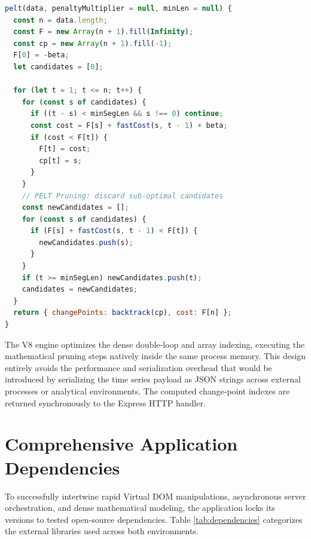 \vspace{1em}
\noindent\begin{minipage}{\linewidth}
\begin{lstlisting}[language=JavaScript, caption=Native V8 Execution Loop for PELT Math Validation, label=lst:js_ipc]
pelt(data, penaltyMultiplier = null, minLen = null) {
  const n = data.length;
  const F = new Array(n + 1).fill(Infinity);
  const cp = new Array(n + 1).fill(-1);
  F[0] = -beta;
  let candidates = [0];

  for (let t = 1; t <= n; t++) {
    for (const s of candidates) {
      if ((t - s) < minSegLen && s !== 0) continue;
      const cost = F[s] + fastCost(s, t - 1) + beta;
      if (cost < F[t]) {
        F[t] = cost;
        cp[t] = s;
      }
    }
    // PELT Pruning: discard sub-optimal candidates
    const newCandidates = [];
    for (const s of candidates) {
      if (F[s] + fastCost(s, t - 1) < F[t]) {
        newCandidates.push(s);
      }
    }
    if (t >= minSegLen) newCandidates.push(t);
    candidates = newCandidates;
  }
  return { changePoints: backtrack(cp), cost: F[n] };
}
\end{lstlisting}
\end{minipage}

The V8 engine optimizes the dense double-loop and array indexing, executing the mathematical pruning steps natively inside the same process memory. This design entirely avoids the performance and serialization overhead that would be introduced by serializing the time series payload as JSON strings across external processes or analytical environments. The computed change-point indexes are returned synchronously to the Express HTTP handler.

\section{Comprehensive Application Dependencies}
To successfully intertwine rapid Virtual DOM manipulations, asynchronous server orchestration, and dense mathematical modeling, the application locks its versions to tested open-source dependencies. Table \ref{tab:dependencies} categorizes the external libraries used across both environments.


